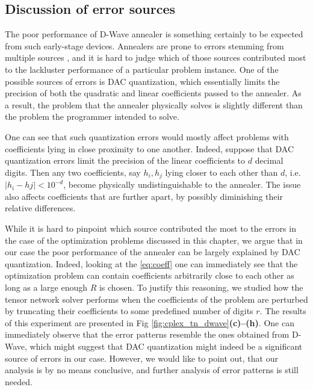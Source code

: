 \subsection{Discussion of error sources}

The poor performance of D-Wave annealer is something certainly to be expected
from such early-stage devices. Annealers are prone to errors stemming from
multiple sources \cite{dwavedocs}, and it is hard to judge which of those sources contributed
most to the lackluster performance of a particular problem instance.
One of the possible sources of errors is DAC quantization, which essentially
limits the precision of both the quadratic and linear coefficients passed to
the annealer. As a result, the problem that the annealer physically solves is
slightly different than the problem the programmer intended to solve.

One can see that such quantization errors would mostly affect problems with
coefficients lying in close proximity to one another. Indeed, suppose that DAC
quantization errors limit the precision of the linear coefficients to $d$
decimal digits. Then any two coefficients, say $h_{i}, h_{{j}}$ lying closer to
each other than $d$, i.e. $|h_{i} - h {j}| < 10^{-d}$, become physically
undistinguishable to the annealer. The issue also affects coefficients that are
further apart, by possibly diminishing their relative differences.

While it is hard to pinpoint which source contributed the most to the errors in
the case of the optimization problems discussed in this chapter, we argue that in
our case the poor performance of the annealer can be largely explained by DAC
quantization. Indeed, looking at the \eqref{eq:coeff} one can immediately see
that the optimization problem can contain coefficients arbitrarily close to
each other as long as a large enough $R$ is chosen. To justify this reasoning,
we studied how the tensor network solver performs when the coefficients of the
problem are perturbed by truncating their coefficients to some predefined
number of digits $r$. The results of this experiment are presented in Fig
\ref{fig:cplex_tn_dwave}\textbf{(c)--(h)}. One can immediately observe that the
error patterns resemble the ones obtained from D-Wave, which might suggest that
DAC quantization might indeed be a significant source of errors in our case.
However, we would like to point out, that our analysis is by no means
conclusive, and further analysis of error patterns is still needed.


